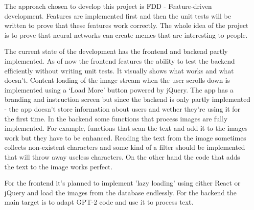 \documentclass[12pt]{report}
\begin{document}
    The approach chosen to develop this project is FDD - Feature-driven development. Features are implemented first and then the unit tests will be written to prove that these features work correctly. The whole idea of the project is to prove that neural networks can create memes that are interesting to people.

    The current state of the development has the frontend and backend partly implemented. As of now the frontend features the ability to test the backend efficiently without writing unit tests. It visually shows what works and what doesn't. Content loading of the image stream when the user scrolls down is implemented using a `Load More' button powered by jQuery. The app has a branding and instruction screen but since the backend is only partly implemented - the app doesn't store information about users and wether they're using it for the first time.
    In the backend some functions that process images are fully implemented. For example, functions that scan the text and add it to the images work but they have to be enhanced. Reading the text from the image sometimes collects non-existent characters and some kind of a filter should be implemented that will throw away useless characters. On the other hand the code that adds the text to the image works perfect.

    For the frontend it's planned to implement 'lazy loading' using either React or jQuery and load the images from the database endlessly. 
    For the backend the main target is to adapt GPT-2 code and use it to process text.

    {}
    
\end{document}
